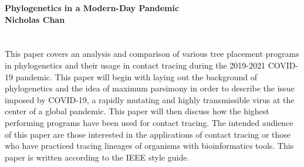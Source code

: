 
 
\begin{titlepage}
    \begin{center}
        \vspace*{2cm}
        \Huge
        \textbf{Phylogenetics in a Modern-Day Pandemic} \\

        \small
        \vspace{0.5cm}
         {\Large\textbf{Nicholas Chan}}
        
        \vfill
        
\section*{\fontsize{12}{15}\selectfont }     
{\normalsize
This paper covers an analysis and comparison of various tree placement programs in phylogenetics and their usage in contact tracing during the 2019-2021 COVID-19 pandemic. This paper will begin with laying out the background of phylogenetics and the idea of maximum parsimony in order to  describe the issue imposed by COVID-19, a rapidly mutating and highly transmissible virus at the center of a global pandemic. This paper will then discuss how the highest performing programs have been used for contact tracing. The intended audience of this paper are those interested in the applications of contact tracing or those who have practiced tracing lineages of organisms with bioinformatics tools. This paper is written according to the IEEE style guide.}

\Large


        
        \vspace{9cm}
        
 
        
    \end{center}
\end{titlepage}
